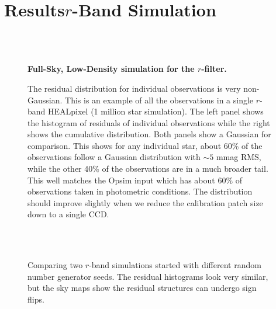 \documentclass[12pt,preprint]{aastex}
\begin{document}

\section{Results$r$-Band Simulation}\label{sec:rband}





\begin{figure}
 \\
 \\
\caption{ {\bf Full-Sky, Low-Density simulation for the $r$-filter.}  \label{fig:r1e6}}
\end{figure}




\begin{figure}
\caption{The residual distribution for individual observations is very non-Gaussian.  This is an example of all the observations in a single $r$-band HEALpixel (1 million star simulation).  The left panel shows the histogram of residuals of individual observations while the right shows the cumulative distribution.  Both panels show a Gaussian for comparison.  This shows for any individual star, about 60\% of the observations follow a Gaussian distribution with $\sim5$ mmag RMS, while the other 40\% of the observations are in a much broader tail.  This well matches the Opsim input which has about 60\% of observations taken in photometric conditions.  The distribution should improve slightly when we reduce the calibration patch size down to a single CCD.  \label{fig:resid_dist}}
\end{figure}


\begin{figure}
 \\
 \\
\caption{Comparing two $r$-band simulations started with different random number generator seeds.  The residual histograms look very similar, but the sky maps show the residual structures can undergo sign flips. \label{fig:diffseed} }
\end{figure}
\end{document}
